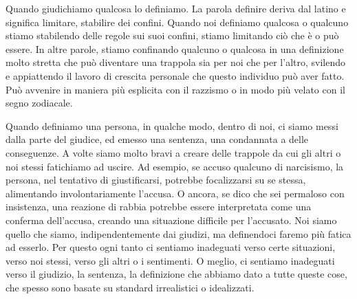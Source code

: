 \documentclass[12pt]{book} %
\begin{document}
Quando giudichiamo qualcosa lo definiamo. La parola definire deriva dal latino e significa limitare, stabilire dei
confini. Quando noi definiamo qualcosa o qualcuno stiamo stabilendo delle regole sui suoi confini, stiamo limitando ciò
che è o può essere. In altre parole, stiamo confinando qualcuno o qualcosa in una definizione molto stretta che può diventare una 
trappola sia per noi che per l'altro, svilendo e appiattendo il lavoro di crescita personale che questo individuo può aver fatto.
Può avvenire in maniera più esplicita con il razzismo o in modo più velato con il segno zodiacale.

Quando definiamo una persona, in qualche modo, dentro di noi, ci siamo messi dalla parte del giudice, ed emesso
una sentenza, una condannata a delle conseguenze. 
A volte siamo molto bravi a creare delle trappole da cui gli altri o noi stessi fatichiamo ad uscire.
Ad esempio, se accuso qualcuno di narcisismo, la persona, nel tentativo di giustificarsi, potrebbe focalizzarsi su se stessa, alimentando involontariamente l'accusa. O ancora, se dico che sei permaloso con insistenza, una reazione di rabbia potrebbe essere interpretata come una conferma dell'accusa, creando una situazione difficile per l'accusato.
Noi siamo quello che siamo,
indipendentemente dai giudizi, ma definendoci faremo più fatica ad esserlo. Per questo ogni tanto ci
sentiamo inadeguati verso certe situazioni, verso noi stessi, verso gli altri o i sentimenti. O meglio, ci sentiamo inadeguati verso il giudizio, la sentenza, la definizione che abbiamo dato a tutte queste cose, che spesso sono basate su standard irrealistici o idealizzati.
\end{document}
